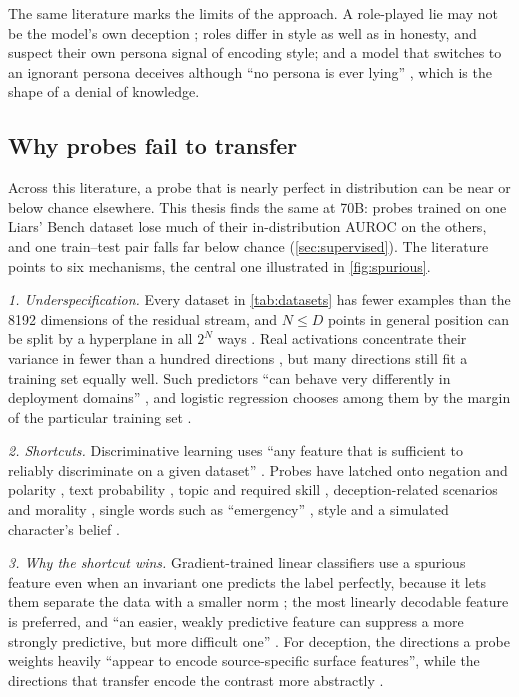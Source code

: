 The same literature marks the limits of the approach. A role-played lie may not be the model's own
deception \cite{smith2025difficulties}; roles differ in style as well as in honesty, and
\textcite{joshi2024personas} suspect their own persona signal of encoding style; and a model that
switches to an ignorant persona deceives although ``no persona is ever lying'' \cite{marks2026persona},
which is the shape of a denial of knowledge.

\subsection{Why probes fail to transfer}
\label{sec:review-transfer}

Across this literature, a probe that is nearly perfect in distribution can be near or below chance
elsewhere. This thesis finds the same at 70B: probes trained on one Liars' Bench dataset lose much of their
in-distribution AUROC on the others, and one train--test pair falls far below chance
(\cref{sec:supervised}). The literature points to six mechanisms, the central one illustrated in
\cref{fig:spurious}.

\emph{1. Underspecification.} Every dataset in \cref{tab:datasets} has fewer examples than the 8192
dimensions of the residual stream, and $N \le D$ points in general position can be split by a hyperplane
in all $2^N$ ways \cite{cover1965geometrical}. Real activations concentrate their variance in fewer than
a hundred directions \cite{ying2026truthfulness}, but many directions still fit a training set equally
well. Such predictors ``can behave very differently in deployment domains''
\cite{damour2022underspecification}, and logistic regression chooses among them by the margin of the
particular training set \cite{soudry2018implicit}.

\emph{2. Shortcuts.} Discriminative learning uses ``any feature that is sufficient to reliably
discriminate on a given dataset'' \cite{geirhos2020shortcut}. Probes have latched
onto negation and polarity \cite{levinstein2025still,buerger2024truth}, text probability
\cite{marks2023geometry}, topic and required skill \cite{orgad2025llms}, deception-related scenarios and
morality \cite{goldowskydill2025detecting}, single words such as ``emergency''
\cite{mckenzie2025highstakes},
style \cite{kumar2026pressure} and a simulated character's belief \cite{farquhar2023challenges}.

\emph{3. Why the shortcut wins.} Gradient-trained linear classifiers use a spurious feature even when
an invariant one predicts the label perfectly, because it lets them separate the data with a smaller
norm \cite{nagarajan2021understanding}; the most linearly decodable feature is preferred, and ``an
easier, weakly predictive feature can suppress a more strongly predictive, but more difficult one''
\cite{hermann2020what}. For deception, the directions a probe weights heavily ``appear to encode
source-specific surface features'', while the directions that transfer encode the contrast more
abstractly \cite{yoo2026subspace}.

